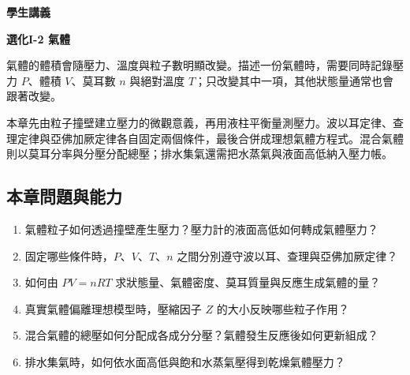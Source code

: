 \documentclass[11pt,a4paper]{article}
\providecommand{\tightlist}{%
  \setlength{\itemsep}{0pt}\setlength{\parskip}{0pt}}
\begin{document}
\begin{tcolorbox}[
  enhanced,colback=white,colframe=HandoutBlue,boxrule=1.1pt,arc=2mm,
  borderline west={3pt}{0pt}{HandoutBlue},left=5mm,right=4mm,top=4mm,bottom=4mm
]
{\sffamily\small\bfseries\color{HandoutBlue}學生講義}\par
{\sffamily\bfseries\LARGE\color{HandoutInk}選化I-2 氣體}\par
\vspace{0.35em}{\large 從粒子撞壁、液柱平衡與狀態變數建立氣體定律，並處理真實氣體、混合氣體與排水集氣資料}\par
{}\par
{}\par
\end{tcolorbox}


氣體的體積會隨壓力、溫度與粒子數明顯改變。描述一份氣體時，需要同時記錄壓力 \(P\)、體積 \(V\)、莫耳數 \(n\) 與絕對溫度 \(T\)；只改變其中一項，其他狀態量通常也會跟著改變。

本章先由粒子撞壁建立壓力的微觀意義，再用液柱平衡量測壓力。波以耳定律、查理定律與亞佛加厥定律各自固定兩個條件，最後合併成理想氣體方程式。混合氣體則以莫耳分率與分壓分配總壓；排水集氣還需把水蒸氣與液面高低納入壓力帳。

\begin{HandoutLearningMap}

\subsection{本章問題與能力}\label{ux672cux7ae0ux554fux984cux8207ux80fdux529b}

\begin{enumerate}
\def\labelenumi{\arabic{enumi}.}
\tightlist
\item
  氣體粒子如何透過撞壁產生壓力？壓力計的液面高低如何轉成氣體壓力？
\item
  固定哪些條件時，\(P\)、\(V\)、\(T\)、\(n\) 之間分別遵守波以耳、查理與亞佛加厥定律？
\item
  如何由 \(PV=nRT\) 求狀態量、氣體密度、莫耳質量與反應生成氣體的量？
\item
  真實氣體偏離理想模型時，壓縮因子 \(Z\) 的大小反映哪些粒子作用？
\item
  混合氣體的總壓如何分配成各成分分壓？氣體發生反應後如何更新組成？
\item
  排水集氣時，如何依水面高低與飽和水蒸氣壓得到乾燥氣體壓力？
\end{enumerate}

\end{HandoutLearningMap}
\end{document}
